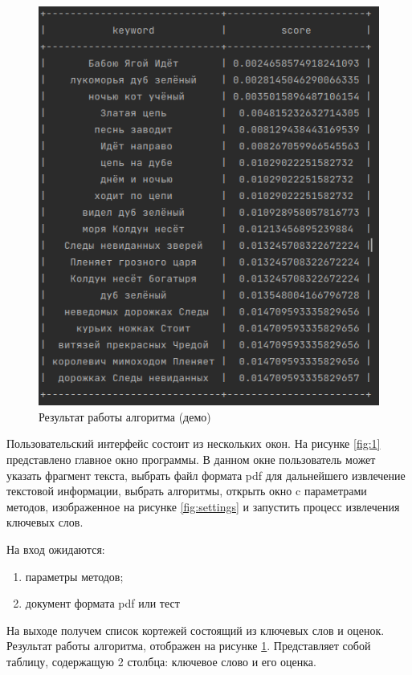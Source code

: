 \begin{figure}[!h]
	\centering
	\includegraphics[width=1\linewidth]{src/img/programm/result}
	\caption{Результат работы алгоритма (демо)}
	\label{fig:result}
\end{figure}

Пользовательский интерфейс состоит из нескольких окон.
На рисунке \ref{fig:1} представлено главное окно программы.
В данном окне пользователь может указать фрагмент текста, выбрать файл формата pdf для дальнейшего извлечение текстовой информации, выбрать алгоритмы, открыть окно c параметрами методов, изображенное на рисунке \ref{fig:settings} и запустить процесс извлечения ключевых слов.

На вход ожидаются:
\begin{enumerate}
	\item параметры методов;
	\item документ формата pdf или тест
\end{enumerate}
На выходе получем список кортежей состоящий из ключевых слов и оценок.
Результат работы алгоритма, отображен на рисунке \ref{fig:result}.
Представляет собой таблицу, содержащую 2 столбца: ключевое слово и его оценка.

